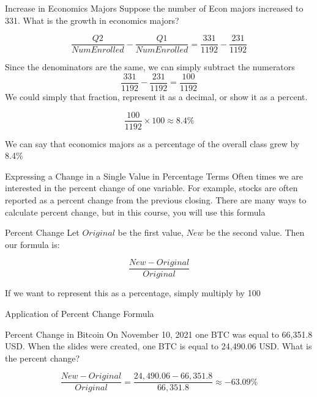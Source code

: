 \documentclass{beamer}
\begin{document}
\begin{frame}

\begin{exampleblock}{Increase in Economics Majors}
Suppose the number of Econ majors increased to 331. What is the growth in economics majors?

$$\frac{Q2}{NumEnrolled} - \frac{Q1}{NumEnrolled} = \frac{331}{1192} - \frac{231}{1192}$$

Since the denominators are the same, we can simply subtract the numerators
$$\frac{331}{1192} - \frac{231}{1192} = \frac{100}{1192}$$
We could simply that fraction, represent it as a decimal, or show it as a percent.

$$\frac{100}{1192} \times 100 \approx 8.4\%$$

We can say that economics majors as a percentage of the overall class grew by 8.4\% 
\end{exampleblock}

\end{frame}

\begin{frame}{Expressing a Change in a Single Value in Percentage Terms}
  Often times we are interested in the percent change of one variable. For example, stocks are often reported as a percent change from the previous closing. There are many ways to calculate percent change, but in this course, you will use this formula

  \begin{block}{Percent Change}
    Let $Original$ be the first value, $New$ be the second value. Then our formula is:

    $$\frac{New-Original}{Original}$$

    If we want to represent this as a percentage, simply multiply by 100
  \end{block}

\end{frame}

\begin{frame}{Application of Percent Change Formula}
\begin{exampleblock}{Percent Change in Bitcoin}
  On November 10, 2021 one BTC was equal to 66,351.8 USD. When the slides were created, one BTC is equal to 24,490.06 USD. What is the percent change? 

  $$\frac{New-Original}{Original} = \frac{24,490.06-66,351.8}{66,351.8} \approx -63.09\%$$
\end{exampleblock}
\end{frame}
\end{document}
